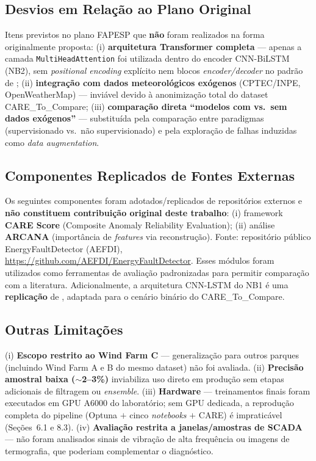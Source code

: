 \documentclass[12pt]{article}
\begin{document}
\subsection{Desvios em Relação ao Plano Original}

\begin{sloppypar}
Itens previstos no plano FAPESP que \textbf{não} foram realizados na forma originalmente proposta: (i) \textbf{arquitetura Transformer completa} --- apenas a camada \texttt{MultiHeadAttention} foi utilizada dentro do encoder CNN-BiLSTM (NB2), sem \textit{positional encoding} explícito nem blocos \textit{encoder/decoder} no padrão de \citet{Vaswani2017}; (ii) \textbf{integração com dados meteorológicos exógenos} (CPTEC/INPE, OpenWeatherMap) --- inviável devido à anonimização total do dataset CARE\_To\_Compare; (iii) \textbf{comparação direta ``modelos com vs.\ sem dados exógenos''} --- substituída pela comparação entre paradigmas (supervisionado vs.\ não supervisionado) e pela exploração de falhas induzidas como \textit{data augmentation}.
\end{sloppypar}

\subsection{Componentes Replicados de Fontes Externas}

\begin{sloppypar}
Os seguintes componentes foram adotados/replicados de repositórios externos e \textbf{não constituem contribuição original deste trabalho}: (i) framework \textbf{CARE Score} (Composite Anomaly Reliability Evaluation); (ii) análise \textbf{ARCANA} (importância de \textit{features} via reconstrução). Fonte: repositório público EnergyFaultDetector (AEFDI), \url{https://github.com/AEFDI/EnergyFaultDetector}. Esses módulos foram utilizados como ferramentas de avaliação padronizadas para permitir comparação com a literatura. Adicionalmente, a arquitetura CNN-LSTM do NB1 é uma \textbf{replicação} de \citet{Qi2024_CNN_LSTM_Energies}, adaptada para o cenário binário do CARE\_To\_Compare.
\end{sloppypar}

\subsection{Outras Limitações}

(i) \textbf{Escopo restrito ao Wind Farm C} --- generalização para outros parques (incluindo Wind Farm A e B do mesmo dataset) não foi avaliada. (ii) \textbf{Precisão amostral baixa ($\sim$2--3\%)} inviabiliza uso direto em produção sem etapas adicionais de filtragem ou \textit{ensemble}. (iii) \textbf{Hardware} --- treinamentos finais foram executados em GPU A6000 do laboratório; sem GPU dedicada, a reprodução completa do pipeline (Optuna $+$ cinco \textit{notebooks} $+$ CARE) é impraticável (Seções~6.1 e 8.3). (iv) \textbf{Avaliação restrita a janelas/amostras de SCADA} --- não foram analisados sinais de vibração de alta frequência ou imagens de termografia, que poderiam complementar o diagnóstico.
\end{document}
